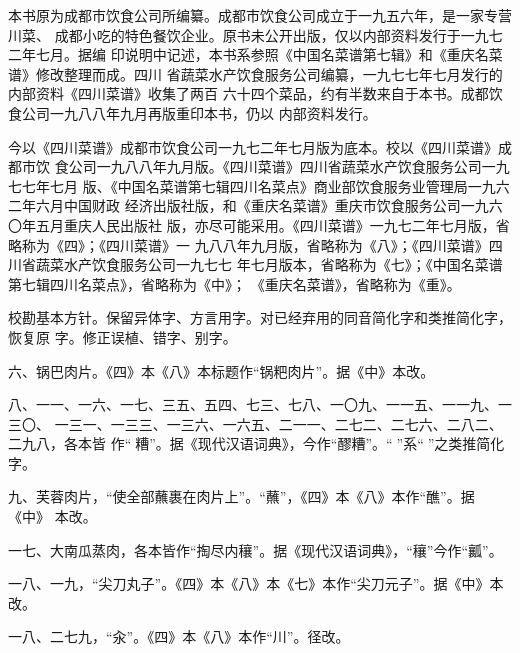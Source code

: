 \begin{list}{}{%
	\setlength{\topsep}{0pt}%
	\setlength{\leftmargin}{.527189mm}%
	\setlength{\rightmargin}{.527189mm}%
	\setlength{\listparindent}{\parindent}%
	\setlength{\itemindent}{\parindent}%
	\setlength{\parsep}{\parskip}%
	\addtolength{\textheight}{2.800042mm}%
}%
\item[]%
\vspace{0\baselineskip plus .5\baselineskip}%

本书原为成都市饮食公司所编纂。成都市饮食公司成立于一九五六年，是一家专营川菜、
成都小吃的特色餐饮企业。原书未公开出版，仅以内部资料发行于一九七二年七月。据编
印说明中记述，本书系参照《中国名菜谱第七辑》和《重庆名菜谱》修改整理而成。四川
省蔬菜水产饮食服务公司编纂，一九七七年七月发行的内部资料《四川菜谱》收集了两百
六十四个菜品，约有半数来自于本书。成都饮食公司一九八八年九月再版重印本书，仍以
内部资料发行。

今以《四川菜谱》成都市饮食公司一九七二年七月版为底本。校以《四川菜谱》成都市饮
食公司一九八八年九月版。《四川菜谱》四川省蔬菜水产饮食服务公司一九七七年七月
版、《中国名菜谱第七辑四川名菜点》商业部饮食服务业管理局一九六二年六月中国财政
经济出版社版，和《重庆名菜谱》重庆市饮食服务公司一九六〇年五月重庆人民出版社
版，亦尽可能采用。《四川菜谱》一九七二年七月版，省略称为《四》；《四川菜谱》一
九八八年九月版，省略称为《八》；《四川菜谱》四川省蔬菜水产饮食服务公司一九七七
年七月版本，省略称为《七》；《中国名菜谱第七辑四川名菜点》，省略称为《中》；
《重庆名菜谱》，省略称为《重》。

校勘基本方针。保留异体字、方言用字。对已经弃用的同音简化字和类推简化字，恢复原
字。修正误植、错字、别字。

\vspace{1\baselineskip}%

六、锅巴肉片。《四》本《八》本标题作“锅粑肉片”。据《中》本改。

八、一一、一六、一七、三五、五四、七三、七八、一〇九、一一五、一一九、一三〇、
一三一、一三三、一三六、一六五、二一一、二七二、二七六、二八二、二九八，各本皆
作“𰪿糟”。据《现代汉语词典》，今作“醪糟”。“𰪿”系“𫃑”之类推简化字。

九、芙蓉肉片，“使全部蘸裹在肉片上”。“蘸”，《四》本《八》本作“醮”。据《中》
本改。

一七、大南瓜蒸肉，各本皆作“掏尽内穰”。据《现代汉语词典》，“穰”今作“瓤”。

一八、一九，“尖刀丸子”。《四》本《八》本《七》本作“尖刀元子”。据《中》本改。

一八、二七九，“汆”。《四》本《八》本作“川”。径改。


\end{list}
